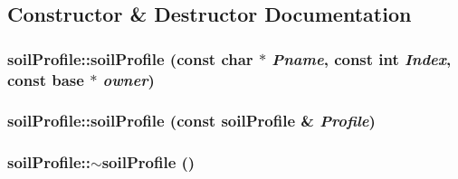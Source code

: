 \subsection{Constructor \& Destructor Documentation}
\hypertarget{classsoil_profile_a189f609ac4771c844111fd994bc6fdd4}{
\subsubsection[{soilProfile}]{\setlength{\rightskip}{0pt plus 5cm}soilProfile::soilProfile (const char $\ast$ {\em Pname}, \/  const int {\em Index}, \/  const {\bf base} $\ast$ {\em owner})}}
\label{classsoil_profile_a189f609ac4771c844111fd994bc6fdd4}
\hypertarget{classsoil_profile_a4047f818afa5dc48f8d7abdeb85658b9}{
\subsubsection[{soilProfile}]{\setlength{\rightskip}{0pt plus 5cm}soilProfile::soilProfile (const {\bf soilProfile} \& {\em Profile})}}
\label{classsoil_profile_a4047f818afa5dc48f8d7abdeb85658b9}
\hypertarget{classsoil_profile_a1af23872681bafd0ed93e666646e5f2d}{
\subsubsection[{$\sim$soilProfile}]{\setlength{\rightskip}{0pt plus 5cm}soilProfile::$\sim$soilProfile ()}}
\label{classsoil_profile_a1af23872681bafd0ed93e666646e5f2d}


